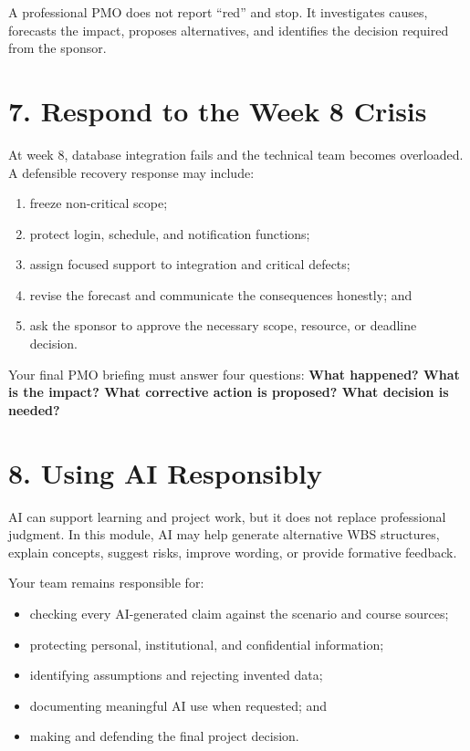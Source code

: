 \documentclass[11pt,a4paper]{article}
\begin{document}
A professional PMO does not report ``red'' and stop. It investigates causes, forecasts the impact, proposes alternatives, and identifies the decision required from the sponsor.

\section{7. Respond to the Week 8 Crisis}

At week 8, database integration fails and the technical team becomes overloaded. A defensible recovery response may include:

\begin{enumerate}
  \item freeze non-critical scope;
  \item protect login, schedule, and notification functions;
  \item assign focused support to integration and critical defects;
  \item revise the forecast and communicate the consequences honestly; and
  \item ask the sponsor to approve the necessary scope, resource, or deadline decision.
\end{enumerate}

Your final PMO briefing must answer four questions: \textbf{What happened? What is the impact? What corrective action is proposed? What decision is needed?}

\section{8. Using AI Responsibly}

AI can support learning and project work, but it does not replace professional judgment. In this module, AI may help generate alternative WBS structures, explain concepts, suggest risks, improve wording, or provide formative feedback.

Your team remains responsible for:

\begin{itemize}
  \item checking every AI-generated claim against the scenario and course sources;
  \item protecting personal, institutional, and confidential information;
  \item identifying assumptions and rejecting invented data;
  \item documenting meaningful AI use when requested; and
  \item making and defending the final project decision.
\end{itemize}
\end{document}
